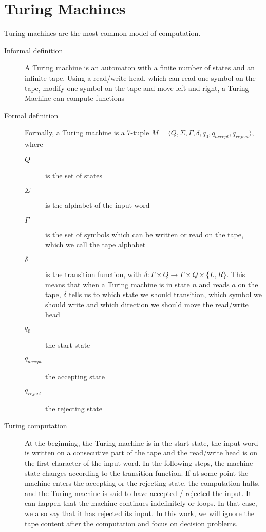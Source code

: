 \section{Turing Machines}\label{sec:turing-machines}
Turing machines are the most common model of computation.
\begin{description}
    \item[Informal definition] A Turing machine is an automaton with a finite number of states and an infinite tape. Using a read/write head, which can read one symbol on the tape, modify one symbol on the tape and move left and right, a Turing Machine can compute functions
    \item[Formal definition] Formally, a Turing machine is a 7-tuple $M = \langle  Q, \Sigma, \Gamma, \delta, q_0, q_{accept}, q_{reject}\rangle$, where
    \begin{description}
        \item[$Q$] is the set of states
        \item[$\Sigma$] is the alphabet of the input word
        \item[$\Gamma$] is the set of symbols which can be written or read on the tape, which we call the tape alphabet
        \item[$\delta$] is the transition function, with $\delta : \Gamma \times Q \to \Gamma \times Q \times \{L, R\}$.
        This means that when a Turing machine is in state $n$ and reads $a$ on the tape, $\delta$ tells us to which state we should transition, which symbol we should write and which direction we should move the read/write head
        \item[$q_0$] the start state
        \item[$q_{accept}$] the accepting state
        \item[$q_{reject}$] the rejecting state
    \end{description}
    \item[Turing computation] At the beginning, the Turing machine is in the start state, the input word is written on a consecutive part of the tape and the read/write head is on the first character of the input word.
    In the following steps, the machine state changes according to the transition function.
    If at some point the machine enters the accepting or the rejecting state, the computation halts, and the Turing machine is said to have accepted / rejected the input.
    It can happen that the machine continues indefinitely or loops.
    In that case, we also say that it has rejected its input.
    In this work, we will ignore the tape content after the computation and focus on decision problems.

\end{description}
